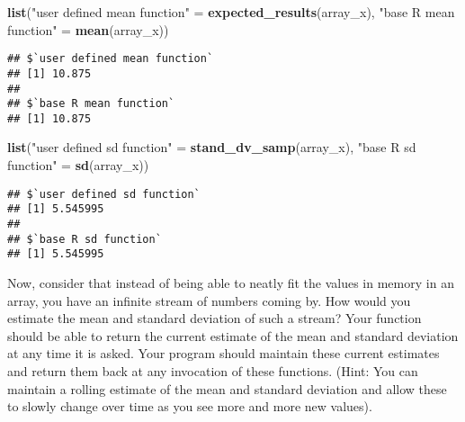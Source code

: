 \documentclass[]{article}
\newenvironment{Shaded}{\begin{snugshade}}{\end{snugshade}}
\newcommand{\KeywordTok}[1]{\textcolor[rgb]{0.13,0.29,0.53}{\textbf{{#1}}}}
\newcommand{\StringTok}[1]{\textcolor[rgb]{0.31,0.60,0.02}{{#1}}}
\newcommand{\NormalTok}[1]{{#1}}
\begin{document}
\newpage 

\begin{Shaded}
\begin{Highlighting}[]
\KeywordTok{list}\NormalTok{(}\StringTok{"user defined mean function"} \NormalTok{=}\StringTok{ }\KeywordTok{expected_results}\NormalTok{(array_x),}
     \StringTok{"base R mean function"} \NormalTok{=}\StringTok{ }\KeywordTok{mean}\NormalTok{(array_x))}
\end{Highlighting}
\end{Shaded}

\begin{verbatim}
## $`user defined mean function`
## [1] 10.875
## 
## $`base R mean function`
## [1] 10.875
\end{verbatim}

\begin{Shaded}
\begin{Highlighting}[]
\KeywordTok{list}\NormalTok{(}\StringTok{"user defined sd function"} \NormalTok{=}\StringTok{ }\KeywordTok{stand_dv_samp}\NormalTok{(array_x), }
     \StringTok{"base R sd function"} \NormalTok{=}\StringTok{ }\KeywordTok{sd}\NormalTok{(array_x))}
\end{Highlighting}
\end{Shaded}

\begin{verbatim}
## $`user defined sd function`
## [1] 5.545995
## 
## $`base R sd function`
## [1] 5.545995
\end{verbatim}

Now, consider that instead of being able to neatly fit the values in
memory in an array, you have an infinite stream of numbers coming by.
How would you estimate the mean and standard deviation of such a stream?
Your function should be able to return the current estimate of the mean
and standard deviation at any time it is asked. Your program should
maintain these current estimates and return them back at any invocation
of these functions. (Hint: You can maintain a rolling estimate of the
mean and standard deviation and allow these to slowly change over time
as you see more and more new values).
\end{document}
